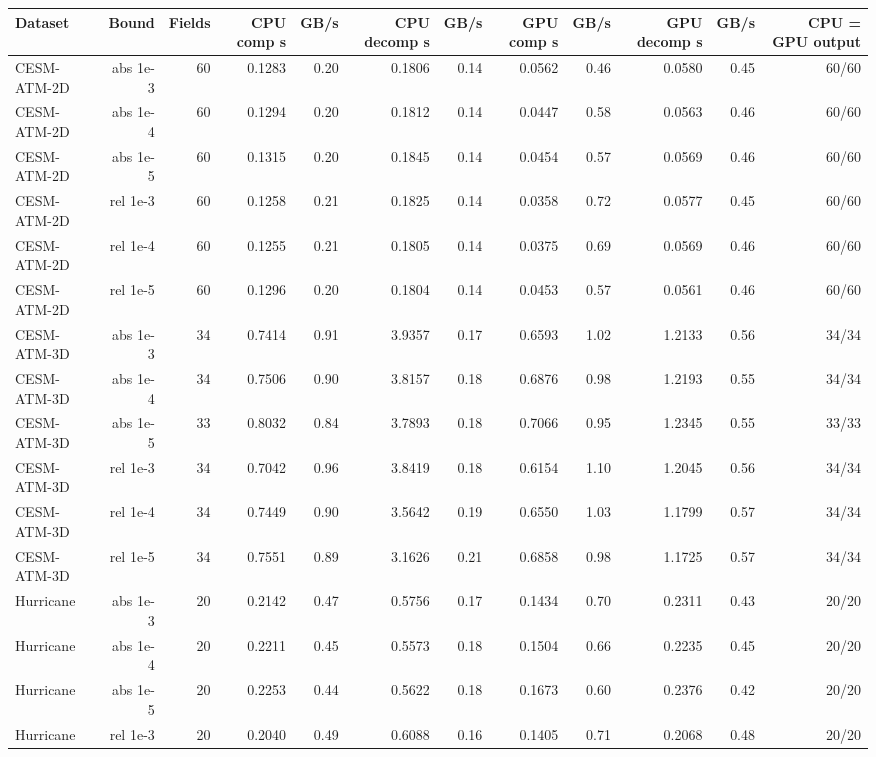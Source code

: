 \begin{tabular}{lrrrrrrrrrrr}
\toprule
\textbf{Dataset} & \textbf{Bound} & \textbf{Fields} & \textbf{CPU comp s} & \textbf{GB/s} & \textbf{CPU decomp s} & \textbf{GB/s} & \textbf{GPU comp s} & \textbf{GB/s} & \textbf{GPU decomp s} & \textbf{GB/s} & \textbf{CPU = GPU output} \\
\midrule
CESM-ATM-2D & abs 1e-3 & 60 & 0.1283 & 0.20 & 0.1806 & 0.14 & 0.0562 & 0.46 & 0.0580 & 0.45 & 60/60 \\
CESM-ATM-2D & abs 1e-4 & 60 & 0.1294 & 0.20 & 0.1812 & 0.14 & 0.0447 & 0.58 & 0.0563 & 0.46 & 60/60 \\
CESM-ATM-2D & abs 1e-5 & 60 & 0.1315 & 0.20 & 0.1845 & 0.14 & 0.0454 & 0.57 & 0.0569 & 0.46 & 60/60 \\
CESM-ATM-2D & rel 1e-3 & 60 & 0.1258 & 0.21 & 0.1825 & 0.14 & 0.0358 & 0.72 & 0.0577 & 0.45 & 60/60 \\
CESM-ATM-2D & rel 1e-4 & 60 & 0.1255 & 0.21 & 0.1805 & 0.14 & 0.0375 & 0.69 & 0.0569 & 0.46 & 60/60 \\
CESM-ATM-2D & rel 1e-5 & 60 & 0.1296 & 0.20 & 0.1804 & 0.14 & 0.0453 & 0.57 & 0.0561 & 0.46 & 60/60 \\
CESM-ATM-3D & abs 1e-3 & 34 & 0.7414 & 0.91 & 3.9357 & 0.17 & 0.6593 & 1.02 & 1.2133 & 0.56 & 34/34 \\
CESM-ATM-3D & abs 1e-4 & 34 & 0.7506 & 0.90 & 3.8157 & 0.18 & 0.6876 & 0.98 & 1.2193 & 0.55 & 34/34 \\
CESM-ATM-3D & abs 1e-5 & 33 & 0.8032 & 0.84 & 3.7893 & 0.18 & 0.7066 & 0.95 & 1.2345 & 0.55 & 33/33 \\
CESM-ATM-3D & rel 1e-3 & 34 & 0.7042 & 0.96 & 3.8419 & 0.18 & 0.6154 & 1.10 & 1.2045 & 0.56 & 34/34 \\
CESM-ATM-3D & rel 1e-4 & 34 & 0.7449 & 0.90 & 3.5642 & 0.19 & 0.6550 & 1.03 & 1.1799 & 0.57 & 34/34 \\
CESM-ATM-3D & rel 1e-5 & 34 & 0.7551 & 0.89 & 3.1626 & 0.21 & 0.6858 & 0.98 & 1.1725 & 0.57 & 34/34 \\
Hurricane & abs 1e-3 & 20 & 0.2142 & 0.47 & 0.5756 & 0.17 & 0.1434 & 0.70 & 0.2311 & 0.43 & 20/20 \\
Hurricane & abs 1e-4 & 20 & 0.2211 & 0.45 & 0.5573 & 0.18 & 0.1504 & 0.66 & 0.2235 & 0.45 & 20/20 \\
Hurricane & abs 1e-5 & 20 & 0.2253 & 0.44 & 0.5622 & 0.18 & 0.1673 & 0.60 & 0.2376 & 0.42 & 20/20 \\
Hurricane & rel 1e-3 & 20 & 0.2040 & 0.49 & 0.6088 & 0.16 & 0.1405 & 0.71 & 0.2068 & 0.48 & 20/20 \\

\end{tabular}
